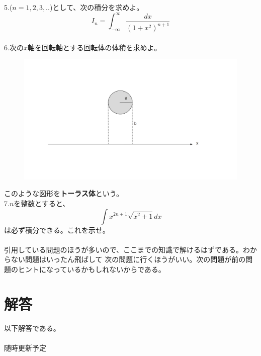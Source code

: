 \documentclass[a4j,dvipdfmx]{jsarticle}
\begin{document}
5.($n=1,2,3,..$)として、次の積分を求めよ。
\begin{equation*}
    I_n=\int_{-\infty}^{\infty}\frac{dx}{(1+x^2)^{n+1}}
\end{equation*}\\

6.次の$x$軸を回転軸とする回転体の体積を求めよ。
\begin{figure}[h]
    \centering
    \includegraphics[width=15cm,scale=5]{img/回転体問題.png}
\end{figure}
このような図形を\textbf{トーラス体}という。\\

7.$n$を整数とすると、
\begin{equation*}
    \int x^{2n+1}\sqrt{x^2+1}dx
\end{equation*}
は必ず積分できる。これを示せ。\\
\hrulefill\\
引用している問題のほうが多いので、ここまでの知識で解けるはずである。わからない問題はいったん飛ばして
次の問題に行くほうがいい。次の問題が前の問題のヒントになっているかもしれないからである。
\newpage
\part{解答}
以下解答である。
\\
\hrulefill\\

{\huge 随時更新予定}
\end{document}
